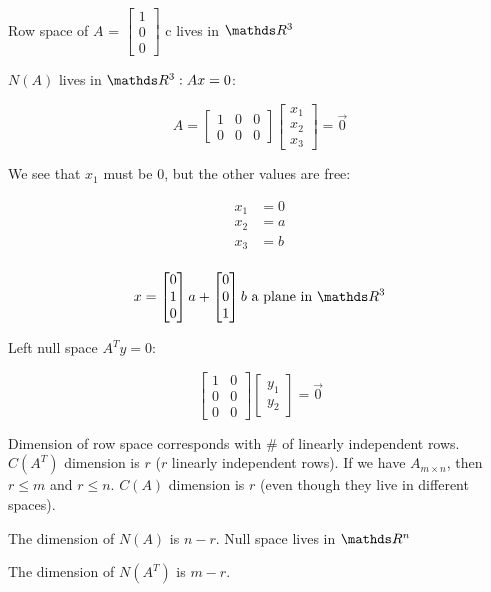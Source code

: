 Row space of $A$ = $\begin{bmatrix} 1 \\ 0 \\ 0 \end{bmatrix}$ c lives in $\bbR^3$

$N(A)$ lives in $\bbR^3: Ax = 0$:

\[
  A = \begin{bmatrix}
    1 & 0 & 0 \\ 0 & 0 & 0
  \end{bmatrix}
  \begin{bmatrix}
    x_1 \\ x_2 \\ x_3
  \end{bmatrix} = \vec{0}
\]

We see that $x_1$ must be 0, but the other values are free:

\begin{align*}
  x_1 &= 0 \\
  x_2 &= a \\
  x_3 &= b \\
\end{align*}

\[
  x = \begin{bmatrix}
    0 \\ 1 \\ 0
  \end{bmatrix} a 
  + \begin{bmatrix}
    0 \\ 0 \\ 1
  \end{bmatrix} b
  \text{ a plane in } \bbR^3
\]

Left null space $A^T y = 0$:

\[
  \begin{bmatrix}
    1 & 0 \\ 0 & 0 \\ 0 & 0
  \end{bmatrix}
  \begin{bmatrix}
    y_1 \\ y_2
  \end{bmatrix} = \vec{0}
\]

Dimension of row space corresponds with \# of linearly independent rows. $C(A^T)$ dimension is $r$ ($r$ linearly independent rows). If we have $A_{m \times n}$, then $r \le m$ and $r \le n$. $C(A)$ dimension is $r$ (even though they live in different spaces).

The dimension of $N(A)$ is $n-r$. Null space lives in $\bbR^n$

The dimension of $N(A^T)$ is $m-r$.
